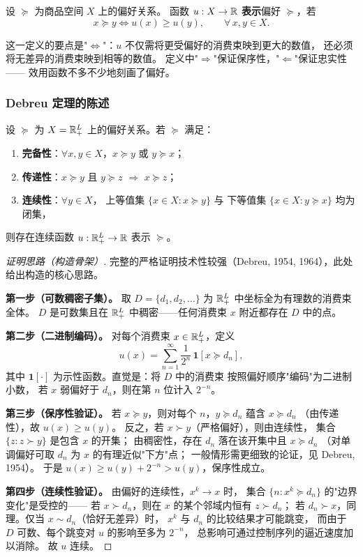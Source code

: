 \begin{definition}[效用表示]\label{def:representation}
设 $\succeq$ 为商品空间 $X$ 上的偏好关系。
函数 $u:X\to\mathbb{R}$ \textbf{表示}偏好 $\succeq$，若
\[
  x\succeq y \iff u(x)\geq u(y), \qquad \forall\, x,y\in X.
\]
\end{definition}

这一定义的要点是"$\iff$"：$u$ 不仅需将更受偏好的消费束映到更大的数值，
还必须将无差异的消费束映到相等的数值。
定义中"$\Rightarrow$"保证保序性，"$\Leftarrow$"保证忠实性——
效用函数不多不少地刻画了偏好。

\subsubsection{Debreu 定理的陈述}
\label{subsec:debreu-statement}

\begin{theorem}\label{thm:debreu-representation}
设 $\succeq$ 为 $X=\mathbb{R}^L_+$ 上的偏好关系。若 $\succeq$ 满足：
\begin{enumerate}
  \item \textbf{完备性}：$\forall x,y\in X$，$x\succeq y$ 或 $y\succeq x$；
  \item \textbf{传递性}：$x\succeq y$ 且 $y\succeq z$ $\Rightarrow$ $x\succeq z$；
  \item \textbf{连续性}：$\forall y\in X$，
    上等值集 $\{x\in X: x\succeq y\}$ 与
    下等值集 $\{x\in X: y\succeq x\}$ 均为闭集，
\end{enumerate}
则存在连续函数 $u:\mathbb{R}^L_+\to\mathbb{R}$ 表示 $\succeq$。
\end{theorem}

\begin{proof}[证明思路（构造骨架）]
完整的严格证明技术性较强（Debreu, 1954, 1964），此处给出构造的核心思路。

\textbf{第一步（可数稠密子集）。}
取 $D=\{d_1,d_2,\dots\}$ 为 $\mathbb{R}^L_+$ 中坐标全为有理数的消费束全体。
$D$ 是可数集且在 $\mathbb{R}^L_+$ 中稠密——任何消费束 $x$ 附近都存在 $D$ 中的点。

\textbf{第二步（二进制编码）。}
对每个消费束 $x\in\mathbb{R}^L_+$，定义
\[
  u(x)=\sum_{n=1}^{\infty}\frac{1}{2^n}\,\mathbf{1}[x\succeq d_n],
\]
其中 $\mathbf{1}[\cdot]$ 为示性函数。直觉是：将 $D$ 中的消费束
按照偏好顺序"编码"为二进制小数，
若 $x$ 弱偏好于 $d_n$，则在第 $n$ 位计入 $2^{-n}$。

\textbf{第三步（保序性验证）。}
若 $x\succeq y$，则对每个 $n$，$y\succeq d_n$ 蕴含 $x\succeq d_n$
（由传递性），故 $u(x)\geq u(y)$。
反之，若 $x\succ y$（严格偏好），则由连续性，
集合 $\{z: z\succ y\}$ 是包含 $x$ 的开集；
由稠密性，存在 $d_n$ 落在该开集中且 $x\succeq d_n$
（对单调偏好可取 $d_n$ 为 $x$ 的有理近似"下方"点；
一般情形需更细致的论证，见 Debreu, 1954）。
于是 $u(x)\geq u(y)+2^{-n}>u(y)$，保序性成立。

\textbf{第四步（连续性验证）。}
由偏好的连续性，$x^k\to x$ 时，
集合 $\{n: x^k\succeq d_n\}$ 的"边界变化"是受控的——
若 $x\succ d_n$，则在 $x$ 的某个邻域内恒有 $z\succ d_n$；
若 $d_n\succ x$，同理。仅当 $x\sim d_n$（恰好无差异）时，
$x^k$ 与 $d_n$ 的比较结果才可能跳变，
而由于 $D$ 可数、每个跳变对 $u$ 的影响至多为 $2^{-n}$，
总影响可通过控制序列的逼近速度加以消除。
故 $u$ 连续。
\end{proof}

